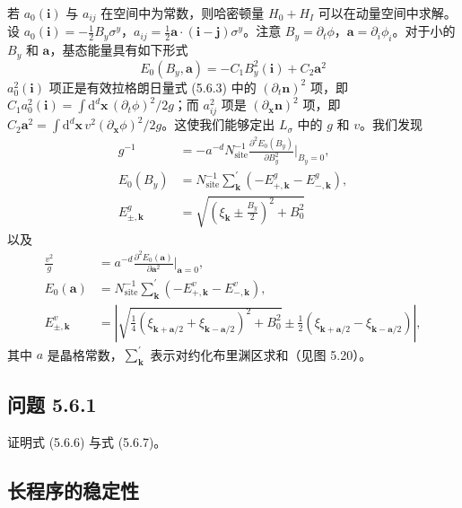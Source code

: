 若 $a_{0}(\pmb{i})$ 与 $a_{ij}$ 在空间中为常数，则哈密顿量 $H_{0}+H_{I}$ 可以在动量空间中求解。设 $a_{0}(\pmb{i})=-\frac{1}{2}B_{y}\sigma^{y}$，$a_{ij}=\frac{1}{2}\pmb{a}\cdot(\pmb{i}-\pmb{j})\sigma^{y}$。注意 $B_{y}=\partial_{t}\phi$，$\pmb{a}=\partial_{i}\phi_{i}$。对于小的 $B_{y}$ 和 $\pmb{a}$，基态能量具有如下形式
\begin{equation*}
E_{0}(B_{y},\pmb{a})=-C_{1}B^{2}_{y}(\pmb{i})+C_{2}\pmb{a}^{2} \tag{5.6.5}
\end{equation*}
$a^{2}_{0}(\pmb{i})$ 项正是有效拉格朗日量式 (5.6.3) 中的 $(\partial_{t}\pmb{n})^{2}$ 项，即 $C_{1}a^{2}_{0}(\pmb{i})=\int \mathrm{d}^{d}\pmb{x}\,(\partial_{t}\phi)^{2}/2g$；而 $a^{2}_{ij}$ 项是 $(\partial_{\pmb{x}}\pmb{n})^{2}$ 项，即 $C_{2}\pmb{a}^{2}=\int \mathrm{d}^{d}\pmb{x}\,v^{2}(\partial_{\pmb{x}}\phi)^{2}/2g$。这使我们能够定出 $L_{\sigma}$ 中的 $g$ 和 $v$。我们发现
\begin{align*}
g^{-1}&=-a^{-d}N^{-1}_{\mathrm{site}}\frac{\partial^{2}E_{0}(B_{y})}{\partial B^{2}_{y}}\bigg|_{B_{y}=0},\\
E_{0}(B_{y})&=N^{-1}_{\mathrm{site}}\sum^{\prime}_{\pmb{k}}\left(-E^{g}_{+,\pmb{k}}-E^{g}_{-,\pmb{k}}\right), \tag{5.6.6}\\
E^{g}_{\pm,\pmb{k}}&=\sqrt{\left(\xi_{\pmb{k}}\pm\frac{B_{y}}{2}\right)^{2}+B^{2}_{0}}
\end{align*}
以及
\begin{align*}
\frac{v^{2}}{g}&=a^{-d}\frac{\partial^{2}E_{0}(\pmb{a})}{\partial\pmb{a}^{2}}\bigg|_{\pmb{a}=0},\\
E_{0}(\pmb{a})&=N^{-1}_{\mathrm{site}}\sum^{\prime}_{\pmb{k}}\left(-E^{v}_{+,\pmb{k}}-E^{v}_{-,\pmb{k}}\right), \tag{5.6.7}\\
E^{v}_{\pm,\pmb{k}}&=\left|\sqrt{\frac{1}{4}\left(\xi_{\pmb{k}+\pmb{a}/2}+\xi_{\pmb{k}-\pmb{a}/2}\right)^{2}+B^{2}_{0}}\pm\frac{1}{2}\left(\xi_{\pmb{k}+\pmb{a}/2}-\xi_{\pmb{k}-\pmb{a}/2}\right)\right|,
\end{align*}
其中 $a$ 是晶格常数，$\sum^{\prime}_{\pmb{k}}$ 表示对约化布里渊区求和（见图 5.20）。

\subsection*{问题 5.6.1}

证明式 (5.6.6) 与式 (5.6.7)。

\subsection{长程序的稳定性}

